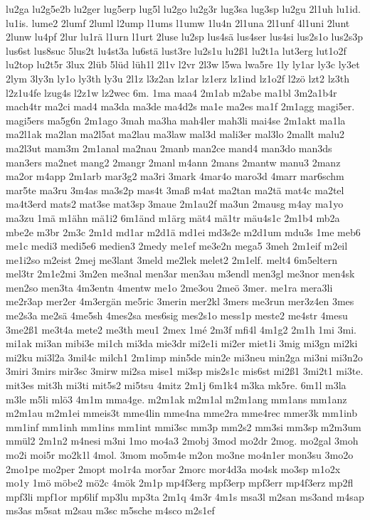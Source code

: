 {lu2ga
lu2g5e2b
lu2ger
lug5erp
lug5l
lu2go
lu2g3r
lug3sa
lug3sp
lu2gu
2l1uh
lu1id.
lu1is.
lume2
2lumf
2luml
l2ump
l1ums
l1umw
1lu4n
2l1una
2l1unf
4l1uni
2lunt
2lunw
lu4pf
2lur
lu1rä
l1urn
l1urt
2luse
lu2sp
lus4sä
lus4ser
lus4si
lus2s1o
lus2s3p
lus6st
lus8suc
5lus2t
lu4st3a
lu6stä
lust3re
lu2s1u
lu2ß1
lu2t1a
lut3erg
lut1o2f
lu2top
lu2t5r
3lux
2lüb
5lüd
lüh1l
2l1v
l2vr
2l3w
l5wa
lwa5re
1ly
ly1ar
ly3c
ly3et
2lym
3ly3n
ly1o
ly3th
ly3u
2l1z
l3z2an
lz1ar
lz1erz
lz1ind
lz1o2f
l2zö
lzt2
lz3th
l2z1u4fe
lzug4s
l2z1w
lz2wec
6m.
1ma
maa4
2m1ab
m2abe
ma1bl
3m2a1b4r
mach4tr
ma2ci
mad4
ma3da
ma3de
ma4d2s
ma1e
ma2es
ma1f
2m1agg
magi5er.
magi5ers
ma5g6n
2m1ago
3mah
ma3ha
mah4ler
mah3li
mai4se
2m1akt
ma1la
ma2l1ak
ma2lan
ma2l5at
ma2lau
ma3law
mal3d
mali3er
mal3lo
2mallt
malu2
ma2l3ut
mam3m
2m1anal
ma2nau
2manb
man2ce
mand4
man3do
man3ds
man3ers
ma2net
mang2
2mangr
2manl
m4ann
2mans
2mantw
manu3
2manz
ma2or
m4app
2m1arb
mar3g2
ma3ri
3mark
4mar4o
maro3d
4marr
mar6schm
mar5te
ma3ru
3m4as
ma3s2p
mas4t
3maß
m4at
ma2tan
ma2tä
mat4c
ma2tel
ma4t3erd
mats2
mat3se
mat3sp
3maue
2m1au2f
ma3un
2mausg
m4ay
ma1yo
ma3zu
1mä
m1ähn
mä1i2
6m1änd
m1ärg
mät4
mä1tr
mäu4s1c
2m1b4
mb2a
mbe2e
m3br
2m3c
2m1d
md1ar
m2d1ä
md1ei
md3s2e
m2d1um
mdu3s
1me
meb6
me1c
medi3
medi5e6
medien3
2medy
me1ef
me3e2n
mega5
3meh
2m1eif
m2eil
me1i2so
m2eist
2mej
me3lant
3meld
me2lek
melet2
2m1elf.
melt4
6m5eltern
mel3tr
2m1e2mi
3m2en
me3nal
men3ar
men3au
m3endl
men3gl
me3nor
men4sk
men2so
men3ta
4m3entn
4mentw
me1o
2me3ou
2meö
3mer.
me1ra
mera3li
me2r3ap
mer2er
4m3ergän
me5ric
3merin
mer2kl
3mers
me3run
mer3z4en
3mes
me2s3a
me2sä
4me5sh
4mes2sa
mes6sig
mes2s1o
mess1p
meste2
me4str
4mesu
3me2ß1
me3t4a
mete2
me3th
meu1
2mex
1mé
2m3f
mfi4l
4m1g2
2m1h
1mi
3mi.
mi1ak
mi3an
mibi3e
mi1ch
mi3da
mie3dr
mi2e1i
mi2er
miet1i
3mig
mi3gn
mi2ki
mi2ku
mi3l2a
3mil4c
milch1
2m1imp
min5de
min2e
mi3neu
min2ga
mi3ni
mi3n2o
3miri
3mirs
mir3sc
3mirw
mi2sa
mise1
mi3sp
mis2s1c
mis6st
mi2ß1
3mi2t1
mi3te.
mit3es
mit3h
mi3ti
mit5s2
mi5tsu
4mitz
2m1j
6m1k4
m3ka
mk5re.
6m1l
m3la
m3le
m5li
mlö3
4m1m
mma4ge.
m2m1ak
m2m1al
m2m1ang
mm1ans
mm1anz
m2m1au
m2m1ei
mmeis3t
mme4lin
mme4na
mme2ra
mme4rec
mmer3k
mm1inb
mm1inf
mm1inh
mm1ins
mm1int
mmi3sc
mm3p
mm2s2
mm3si
mm3sp
m2m3um
mmül2
2m1n2
m4nesi
m3ni
1mo
mo4a3
2mobj
3mod
mo2dr
2mog.
mo2gal
3moh
mo2i
moi5r
mo2k1l
4mol.
3mom
mo5m4e
m2on
mo3ne
mo4n1er
mon3su
3mo2o
2mo1pe
mo2per
2mopt
mo1r4a
mor5ar
2morc
mor4d3a
mo4sk
mo3sp
m1o2x
mo1y
1mö
möbe2
mö2c
4mök
2m1p
mp4f3erg
mpf3erp
mpf3err
mp4f3erz
mp2fl
mpf3li
mpf1or
mp6lif
mp3lu
mp3ta
2m1q
4m3r
4m1s
msa3l
m2san
ms3and
m4sap
ms3as
m5sat
m2sau
m3sc
m5sche
m4sco
m2s1ef
}
